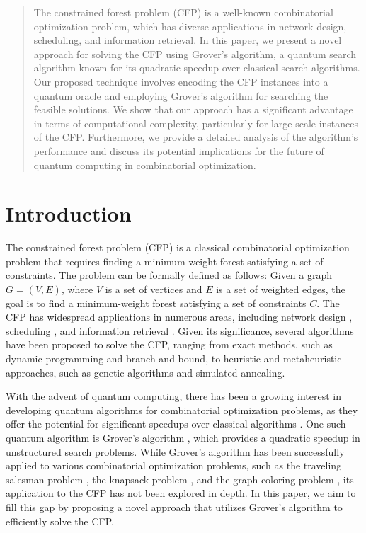 \begin{abstract}
The constrained forest problem (CFP) is a well-known combinatorial optimization problem, which has diverse applications in network design, scheduling, and information retrieval. In this paper, we present a novel approach for solving the CFP using Grover's algorithm, a quantum search algorithm known for its quadratic speedup over classical search algorithms. Our proposed technique involves encoding the CFP instances into a quantum oracle and employing Grover's algorithm for searching the feasible solutions. We show that our approach has a significant advantage in terms of computational complexity, particularly for large-scale instances of the CFP. Furthermore, we provide a detailed analysis of the algorithm's performance and discuss its potential implications for the future of quantum computing in combinatorial optimization.

\end{abstract}

\section{Introduction}

The constrained forest problem (CFP) is a classical combinatorial optimization problem that requires finding a minimum-weight forest satisfying a set of constraints. The problem can be formally defined as follows: Given a graph $G=(V,E)$, where $V$ is a set of vertices and $E$ is a set of weighted edges, the goal is to find a minimum-weight forest satisfying a set of constraints $C$. The CFP has widespread applications in numerous areas, including network design \cite{network_design}, scheduling \cite{scheduling}, and information retrieval \cite{information_retrieval}. Given its significance, several algorithms have been proposed to solve the CFP, ranging from exact methods, such as dynamic programming and branch-and-bound, to heuristic and metaheuristic approaches, such as genetic algorithms and simulated annealing.

With the advent of quantum computing, there has been a growing interest in developing quantum algorithms for combinatorial optimization problems, as they offer the potential for significant speedups over classical algorithms \cite{grover_speedup}. One such quantum algorithm is Grover's algorithm \cite{grover1996}, which provides a quadratic speedup in unstructured search problems. While Grover's algorithm has been successfully applied to various combinatorial optimization problems, such as the traveling salesman problem \cite{TSP}, the knapsack problem \cite{knapsack}, and the graph coloring problem \cite{coloring}, its application to the CFP has not been explored in depth. In this paper, we aim to fill this gap by proposing a novel approach that utilizes Grover's algorithm to efficiently solve the CFP.

